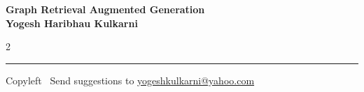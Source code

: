 \documentclass[8pt,landscape]{article}
\begin{document}
\footnotesize


\begin{center}
\Large{\textbf{Graph Retrieval Augmented Generation\\ Yogesh Haribhau Kulkarni}}  
\end{center}

\begin{multicols}{2}

\end{multicols}

\rule{\linewidth}{0.25pt}
\scriptsize
Copyleft \textcopyleft\  Send suggestions to 
\href{http://www.yogeshkulkarni.com}{yogeshkulkarni@yahoo.com}
\end{document}
